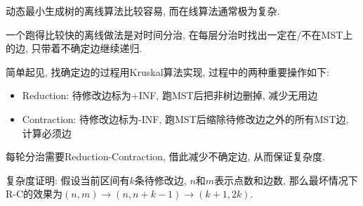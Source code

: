动态最小生成树的离线算法比较容易, 而在线算法通常极为复杂.

一个跑得比较快的离线做法是对时间分治, 在每层分治时找出一定在/不在MST上的边, 只带着不确定边继续递归.

简单起见, 找确定边的过程用Kruskal算法实现, 过程中的两种重要操作如下:

\begin{itemize}
	\item Reduction: 待修改边标为+INF, 跑MST后把非树边删掉, 减少无用边
	\item Contraction: 待修改边标为-INF, 跑MST后缩除待修改边之外的所有MST边, 计算必须边
\end{itemize}

每轮分治需要Reduction-Contraction, 借此减少不确定边, 从而保证复杂度.

复杂度证明: 假设当前区间有$k$条待修改边, $n$和$m$表示点数和边数, 那么最坏情况下R-C的效果为$(n, m) \to (n, n + k - 1) \to (k + 1, 2k)$.

\inputminted{cpp}{../src/graph/动态最小生成树.cpp}
